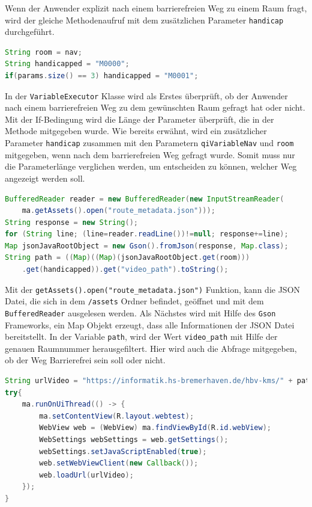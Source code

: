 Wenn der Anwender explizit nach einem barrierefreien Weg zu einem Raum fragt, wird der gleiche Methodenaufruf mit dem zusätzlichen Parameter \verb|handicap| durchgeführt.\\

\begin{lstlisting}[language=Java, caption={Optioanle Barrierefreiheit}]
String room = nav;
String handicapped = "M0000";
if(params.size() == 3) handicapped = "M0001";
\end{lstlisting}


In der \verb|VariableExecutor| Klasse wird als Erstes überprüft, ob der Anwender nach einem barrierefreien Weg zu dem gewünschten Raum gefragt hat oder nicht. Mit der If-Bedingung wird die Länge der Parameter überprüft, die in der Methode mitgegeben wurde. Wie bereits erwähnt, wird ein zusätzlicher Parameter \verb|handicap| zusammen mit den Parametern \verb|qiVariableNav| und \verb|room| mitgegeben, wenn nach dem barrierefreien Weg gefragt wurde. Somit muss nur die Parameterlänge verglichen werden, um entscheiden zu können, welcher Weg angezeigt werden soll.\\

\begin{lstlisting}[language=Java, caption={Auslesen der Routenfinder Daten}]
BufferedReader reader = new BufferedReader(new InputStreamReader(
    ma.getAssets().open("route_metadata.json")));
String response = new String();
for (String line; (line=reader.readLine())!=null; response+=line);
Map jsonJavaRootObject = new Gson().fromJson(response, Map.class);
String path = ((Map)((Map)(jsonJavaRootObject.get(room)))
    .get(handicapped)).get("video_path").toString();
\end{lstlisting}

Mit der \verb|getAssets().open("route_metadata.json")| Funktion, kann die JSON Datei, die sich in dem \verb|/assets| Ordner befindet, geöffnet und mit dem \verb|BufferedReader| ausgelesen werden. Als Nächstes wird mit Hilfe des \verb|Gson| Frameworks, ein Map Objekt erzeugt, dass alle Informationen der JSON Datei bereitstellt. In der Variable \verb|path|, wird der Wert 
\verb|video_path| mit Hilfe der genauen Raumnummer herausgefiltert. Hier wird auch die Abfrage mitgegeben, ob der Weg Barrierefrei sein soll oder nicht.\\

\begin{lstlisting}[language=Java, caption={Darstellung der Wegbeschreibung auf Peppers Tablet}]
String urlVideo = "https://informatik.hs-bremerhaven.de/hbv-kms/" + path;
try{
    ma.runOnUiThread(() -> {
        ma.setContentView(R.layout.webtest);
        WebView web = (WebView) ma.findViewById(R.id.webView);
        WebSettings webSettings = web.getSettings();
        webSettings.setJavaScriptEnabled(true);
        web.setWebViewClient(new Callback());
        web.loadUrl(urlVideo);
    });
}
\end{lstlisting}

